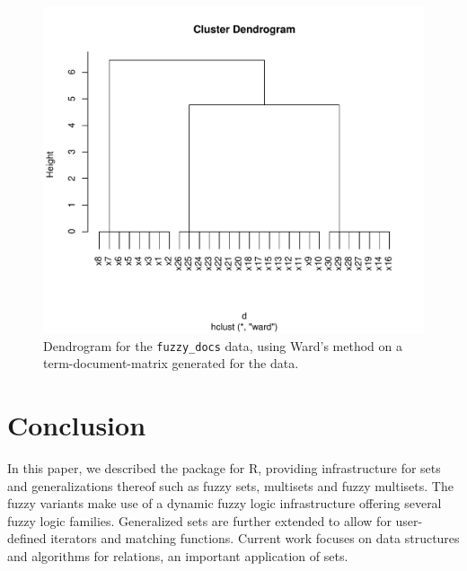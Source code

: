 \documentclass[article]{jss}
\newcommand\R{\textsf{R}}
\begin{document}
\begin{figure}[h]
\begin{center}
\includegraphics{JSS-clusterplot2}
\caption{Dendrogram for the \texttt{fuzzy\_docs} data, using Ward's
  method on a term-document-matrix generated for the data.}
\label{fig:cluster2}
\end{center}
\end{figure}

\section{Conclusion}
\label{sec:conclusion}

In this paper, we described the  package for \R, providing
infrastructure for sets and generalizations thereof such as fuzzy
sets, multisets and fuzzy multisets. The fuzzy variants make use of a
dynamic fuzzy logic infrastructure offering several fuzzy logic
families. Generalized sets are further extended to allow for
user-defined iterators and matching functions. Current work focuses on
data structures and algorithms for relations,
an important application of sets.
\end{document}
